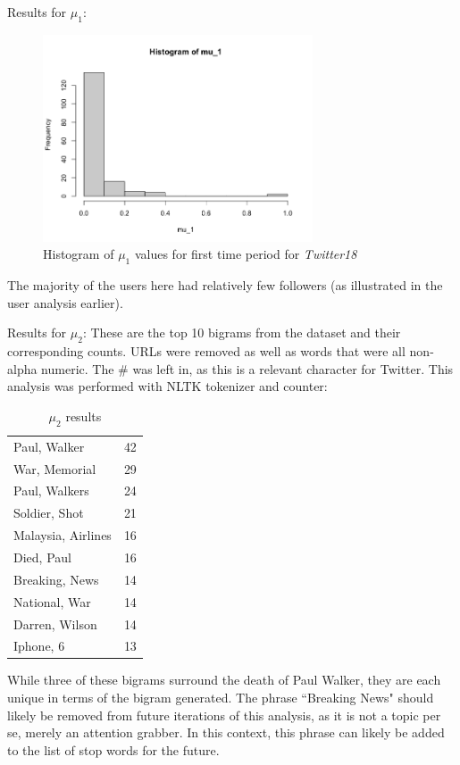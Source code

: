 \documentclass[preprint,review,12pt]{elsarticle}
\begin{document}
Results for $\mu_1$:
\begin{figure}[h]
    \centering
    \includegraphics[width=8cm]{Histogram of mu_1 twitter15.png}
    \caption{Histogram of $\mu_1$ values for first time period for \textit{Twitter18}}
    \label{fig:Hist mu_1 Twitter18}
\end{figure}
The majority of the users here had relatively few followers (as illustrated in the user analysis earlier). 

Results for $\mu_2$:
These are the top 10 bigrams from the dataset and their corresponding counts. URLs were removed as well as words that were all non-alpha numeric. The \# was left in, as this is a relevant character for Twitter. This analysis was performed with NLTK tokenizer and counter:

\begin{table}[h]
    \centering
    \begin{tabular}{|p{4cm}|p{2cm}|}
    \hline
         Paul, Walker & 42 \\
         War, Memorial & 29 \\
         Paul, Walkers & 24 \\
         Soldier, Shot & 21 \\
         Malaysia, Airlines & 16 \\
         Died, Paul & 16 \\
         Breaking, News & 14 \\
         National, War & 14 \\
         Darren, Wilson & 14 \\
         Iphone, 6 & 13 \\
    \hline
    \end{tabular}
    \caption{$\mu_2$ results}
    \label{tab:mu_2 results}
\end{table}

While three of these bigrams surround the death of Paul Walker, they are each unique in terms of the bigram generated. The phrase ``Breaking News" should likely be removed from future iterations of this analysis, as it is not a topic per se, merely an attention grabber. In this context, this phrase can likely be added to the list of stop words for the future.
\end{document}
